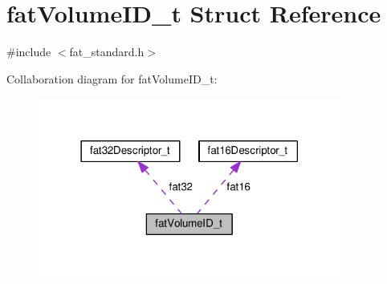 \hypertarget{structfatVolumeID__t}{\section{fat\+Volume\+I\+D\+\_\+t Struct Reference}
\label{structfatVolumeID__t}
}


{\ttfamily \#include $<$fat\+\_\+standard.\+h$>$}



Collaboration diagram for fat\+Volume\+I\+D\+\_\+t\+:\nopagebreak
\begin{figure}[H]
\begin{center}
\leavevmode
\includegraphics[width=282pt]{structfatVolumeID__t__coll__graph}
\end{center}
\end{figure}
